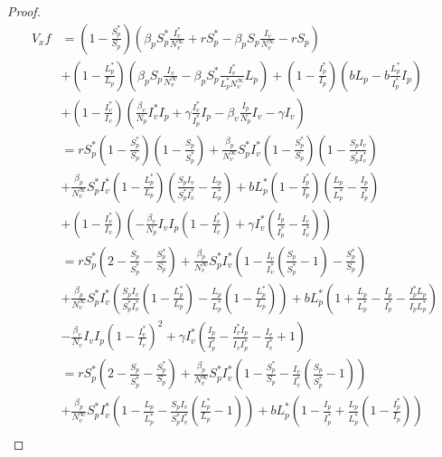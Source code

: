 \begin{proof}
		\begin{align*}
			V_xf &=
					\left(1-\frac{S^*_p}{S_p}\right)\left(\beta_pS^*_p\frac{I^*_v}{N^\infty_v}+rS^*_p-\beta_pS_p\frac{I_v}{N^\infty_v}-rS_p\right)\\
				 &+
					\left(1-\frac{L^*_p}{L_p}\right)\left(\beta_pS_p\frac{I_v}{N^\infty_v}-\beta_pS^*_p\frac{I^*_v}{L^*_p N^\infty_v}L_p\right)+\left(1-\frac{I^*_p}{I_p}\right)\left(bL_p-b\frac{L^*_p}{I^*_p}I_p\right)\\
				&+
					\left(1-\frac{I^*_v}{I_v}\right)\left(\frac{\beta_v}{N_p}I^*_vI_p+\gamma \frac{I^*_v}{I^*_p}I_p-\beta_v \frac{I_p}{N_p}I_v-\gamma I_v\right)\\
				&=
					rS^*_p\left(1-\frac{S^*_p}{S_p}\right)\left(1-\frac{S_p}{S^*_p}\right)+\frac{\beta_p}{N^\infty_v}S_p^*I_v^*\left(1-\frac{S^*_p}{S_p}\right)\left(1-\frac{S_pI_v}{S^*_pI_v^*}\right)\\
				&+
					\frac{\beta_p}{N^\infty_v}S_p^*I_v^*\left(1-\frac{L^*_p}{L_p}\right)\left(\frac{S_pI_v}{S^*_pI_v^*}-\frac{L_p}{L^*_p}\right)+bL^*_p\left(1-\frac{I^*_p}{I_p}\right)\left(\frac{L_p}{L_p^*}-\frac{I_p}{I_p^*}\right)\\
				&+ \left(1-\frac{I^*_v}{I_v}\right)\left(-\frac{\beta_v}{N_p}I_vI_p\left(1-\frac{I^*_v}{I_v}\right)+\gamma I_v^*\left(\frac{I_p}{I_p^*}-\frac{I_v}{I_v^*}\right)\right)\\
				&=
					rS_p^*\left(2-\frac{S_p}{S_p^*}-\frac{S_p^*}{S_p}\right)+\frac{\beta_p}{N^\infty_v}S_p^*I_v^*\left(1-\frac{I_v}{I_v^*}\left(\frac{S_p}{S_p^*}-1\right)-\frac{S_p^*}{S_p}\right)\\
				&+
					\frac{\beta_p}{N^\infty_v}S_p^*I_v^*\left(\frac{S_pI_v}{S_p^*I_v^*}\left(1-\frac{L_p^*}{L_p}\right)-\frac{L_p}{L_p^*}\left(1-\frac{L_p^*}{L_p}\right)\right)+bL_p^*\left(1+\frac{L_p}{L_p^*}-\frac{I_p}{I_p^*}-\frac{I_p^*L_p}{I_pL_p^*}\right)\\
				&-
					\frac{\beta_v}{N_v}I_vI_p\left(1-\frac{I_v^*}{I_v}\right)^2+\gamma I_v^*\left(\frac{I_p}{I_p^*}-\frac{I_v^*I_p}{I_vI_p^*}-\frac{I_v}{I_v^*}+1\right)\\
				&=
					rS_p^*\left(2-\frac{S_p}{S_p^*}-\frac{S_p^*}{S_p}\right)+\frac{\beta_p}{N^\infty_v}S_p^*I_v^*\left(1-\frac{S_p^*}{S_p}-\frac{I_v}{I_v^*}\left(\frac{S_p}{S_p^*}-1\right)\right)\\
				&+
					\frac{\beta_p}{N^\infty_v}S_p^*I_v^*\left(1-\frac{L_p}{L_p^*}-\frac{S_pI_v}{S_p^*I_v^*}\left(\frac{L_p^*}{L_p}-1\right)\right)+
					bL_p^*\left(1-\frac{I_p}{I_p^*}+\frac{L_p}{L_p^*}\left(1-\frac{I_p^*}{I_p}\right)\right)\\

\end{align*}
\end{proof}

